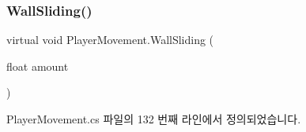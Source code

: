 \mbox{\label{class_player_movement_a9a54ca25bbc57c10ddbd74d4a0b1e30f}} 
\subsubsection{\texorpdfstring{WallSliding()}{WallSliding()}}
{\footnotesize\ttfamily virtual void Player\+Movement.\+Wall\+Sliding (\begin{DoxyParamCaption}\item[{float}]{amount }\end{DoxyParamCaption})\hspace{0.3cm}{\ttfamily [virtual]}}



Player\+Movement.\+cs 파일의 132 번째 라인에서 정의되었습니다.


